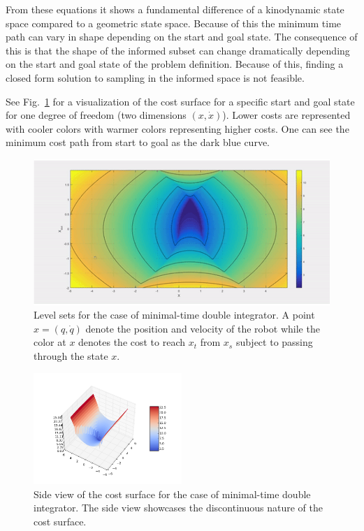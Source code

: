 \documentclass[letterpaper, 10 pt, conference]{ieeeconf}  %
\begin{document}
From these equations it shows a fundamental difference of a kinodynamic state space compared to a geometric state space. Because of this the minimum time path can vary in shape depending on the start and goal state. The consequence of this is that the shape of the informed subset can change dramatically depending on the start and goal state of the problem definition. Because of this, finding a closed form solution to sampling in the informed space is not feasible.

See Fig.~\ref{fig:informed_1d_di} for a visualization of the cost surface for a specific start and goal state for one degree of freedom (two dimensions $\left(x, \dot{x}\right)$). Lower costs are represented with cooler colors with warmer colors representing higher costs. One can see the minimum cost path from start to goal as the dark blue curve.

\begin{figure}[tb]
  \centering
  	\includegraphics[height = 4.cm ]{fig/level_set.jpg}
  \caption{
    \captionstyle
  	Level sets for the case of minimal-time double integrator. A point $x = (q, \dot{q})$  denote the position and velocity of the robot while the color at $x$ denotes the cost to reach $x_t$ from $x_s$ subject to passing through the state $x$.
  	}
   	\label{fig:informed_1d_di}
	\vspace{-5.5mm}
\end{figure}

\begin{figure}[tb]
  \centering
  	\includegraphics[width=0.5\textwidth]{fig/kino_space.png}
  \caption{
    \captionstyle
  	Side view of the cost surface for the case of minimal-time double integrator. The side view showcases the discontinuous nature of the cost surface.
  	}
   	\label{fig:cost_surface_1d}
	\vspace{-5.5mm}
\end{figure}
\end{document}
